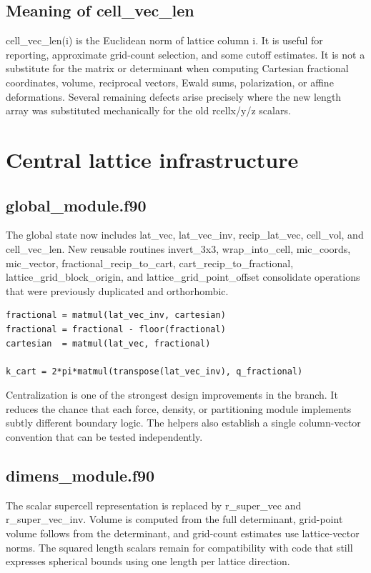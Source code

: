 \documentclass[10pt,a4paper]{report}
\begin{document}
\section{Meaning of cell\_vec\_len}
cell\_vec\_len(i) is the Euclidean norm of lattice column i. It is useful for reporting, approximate grid-count selection, and some cutoff estimates. It is not a substitute for the matrix or determinant when computing Cartesian fractional coordinates, volume, reciprocal vectors, Ewald sums, polarization, or affine deformations. Several remaining defects arise precisely where the new length array was substituted mechanically for the old rcellx/y/z scalars.

\chapter{Central lattice infrastructure}
\section{global\_module.f90}
The global state now includes lat\_vec, lat\_vec\_inv, recip\_lat\_vec, cell\_vol, and cell\_vec\_len. New reusable routines invert\_3x3, wrap\_into\_cell, mic\_coords, mic\_vector, fractional\_recip\_to\_cart, cart\_recip\_to\_fractional, lattice\_grid\_block\_origin, and lattice\_grid\_point\_offset consolidate operations that were previously duplicated and orthorhombic.

\begin{lstlisting}
fractional = matmul(lat_vec_inv, cartesian)
fractional = fractional - floor(fractional)
cartesian  = matmul(lat_vec, fractional)

k_cart = 2*pi*matmul(transpose(lat_vec_inv), q_fractional)
\end{lstlisting}
Centralization is one of the strongest design improvements in the branch. It reduces the chance that each force, density, or partitioning module implements subtly different boundary logic. The helpers also establish a single column-vector convention that can be tested independently.

\section{dimens\_module.f90}
The scalar supercell representation is replaced by r\_super\_vec and r\_super\_vec\_inv. Volume is computed from the full determinant, grid-point volume follows from the determinant, and grid-count estimates use lattice-vector norms. The squared length scalars remain for compatibility with code that still expresses spherical bounds using one length per lattice direction.
\end{document}
